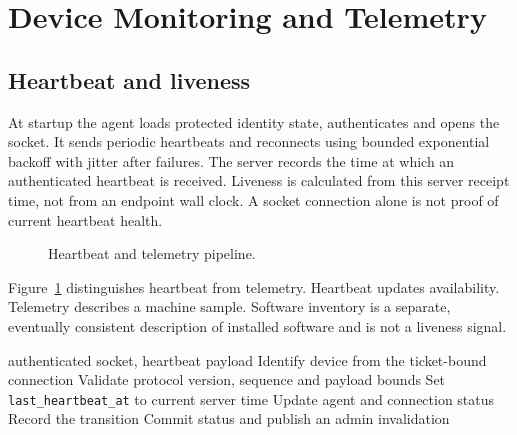 \documentclass[12pt,a4paper]{report}
\begin{document}
\section{Device Monitoring and Telemetry}

\subsection{Heartbeat and liveness}
At startup the agent loads protected identity state, authenticates and opens the
socket. It sends periodic heartbeats and reconnects using bounded exponential
backoff with jitter after failures. The server records the time at which an
authenticated heartbeat is received. Liveness is calculated from this server
receipt time, not from an endpoint wall clock. A socket connection alone is not
proof of current heartbeat health.

\begin{figure}[H]
\centering
{}
\caption{Heartbeat and telemetry pipeline.}
\label{fig:heartbeat-pipeline}
\end{figure}

Figure~\ref{fig:heartbeat-pipeline} distinguishes heartbeat from telemetry.
Heartbeat updates availability. Telemetry describes a machine sample. Software
inventory is a separate, eventually consistent description of installed
software and is not a liveness signal.

\begin{algorithm}[H]
\caption{Authenticated heartbeat processing}
\label{alg:heartbeat}
\begin{algorithmic}[1]
\Require authenticated socket, heartbeat payload
\State Identify device from the ticket-bound connection
\State Validate protocol version, sequence and payload bounds
\State Set \texttt{last\_heartbeat\_at} to current server time
\State Update agent and connection status
  \State Record the transition
\EndIf
\State Commit status and publish an admin invalidation
\end{algorithmic}
\end{algorithm}
\end{document}

